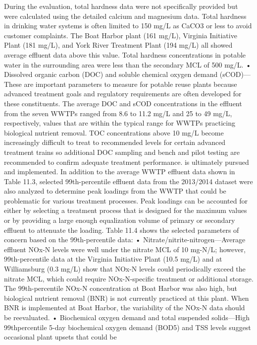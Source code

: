 \documentclass{article}
\begin{document}
During the evaluation, total hardness data were not specifically
provided but were calculated using the detailed calcium and magnesium
data. Total hardness in drinking water systems is often limited to 150
mg/L as CaCO3 or less to avoid customer complaints. The Boat Harbor
plant (161 mg/L), Virginia Initiative Plant (181 mg/L), and York River
Treatment Plant (194 mg/L) all showed average effluent data above this
value. Total hardness concentrations in potable water in the surrounding
area were less than the secondary MCL of 500 mg/L. • Dissolved organic
carbon (DOC) and soluble chemical oxygen demand (sCOD)---These are
important parameters to measure for potable reuse plants because
advanced treatment goals and regulatory requirements are often developed
for these constituents. The average DOC and sCOD concentrations in the
effluent from the seven WWTPs ranged from 8.6 to 11.2 mg/L and 25 to 49
mg/L, respectively, values that are within the typical range for WWTPs
practicing biological nutrient removal. TOC concentrations above 10 mg/L
become increasingly difficult to treat to recommended levels for certain
advanced treatment trains so additional DOC sampling and bench and pilot
testing are recommended to confirm adequate treatment performance. is
ultimately pursued and implemented. In addition to the average WWTP
effluent data shown in Table 11.3, selected 99th-percentile effluent
data from the 2013/2014 dataset were also analyzed to determine peak
loadings from the WWTP that could be problematic for various treatment
processes. Peak loadings can be accounted for either by selecting a
treatment process that is designed for the maximum values or by
providing a large enough equalization volume of primary or secondary
effluent to attenuate the loading. Table 11.4 shows the selected
parameters of concern based on the 99th-percentile data: •
Nitrate/nitrite-nitrogen---Average effluent NOx-N levels were well under
the nitrate MCL of 10 mg-N/L; however, 99th-percentile data at the
Virginia Initiative Plant (10.5 mg/L) and at Williamsburg (0.3 mg/L)
show that NOx-N levels could periodically exceed the nitrate MCL, which
could require NOx-N-specific treatment or additional storage. The
99th-percentile NOx-N concentration at Boat Harbor was also high, but
biological nutrient removal (BNR) is not currently practiced at this
plant. When BNR is implemented at Boat Harbor, the variability of the
NOx-N data should be reevaluated. • Biochemical oxygen demand and total
suspended solids---High 99thpercentile 5-day biochemical oxygen demand
(BOD5) and TSS levels suggest occasional plant upsets that could be
\end{document}
